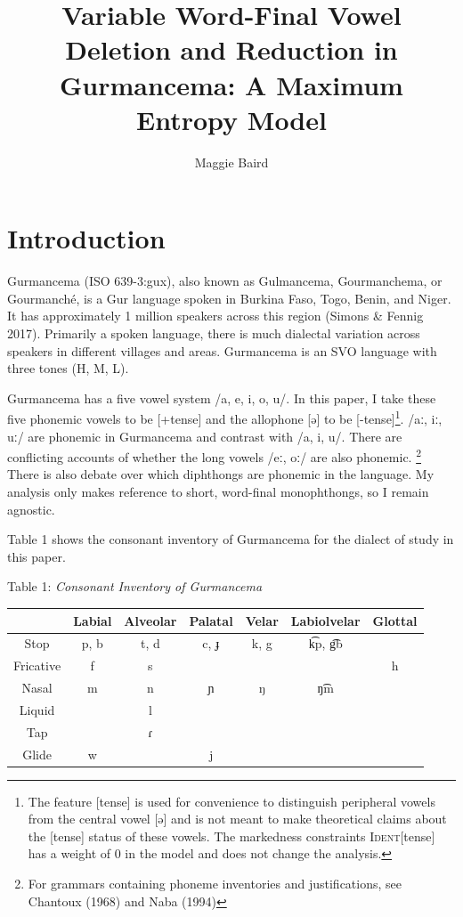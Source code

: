 \documentclass[output=paper,
modfonts
]{langscibook}
\title{Variable Word-Final Vowel Deletion and Reduction in Gurmancema: A Maximum Entropy Model}
\author{%
 Maggie Baird\affiliation{Dartmouth College}
}
\begin{document}
\pagestyle{myheadings}

\maketitle
\section{Introduction} 
Gurmancema (ISO 639-3:gux), also known as Gulmancema, Gourmanchema, or Gourmanché, is a Gur language spoken in Burkina Faso, Togo, Benin, and Niger. It has approximately 1 million speakers across this region \cite{ethnologue}(Simons \& Fennig 2017). Primarily a spoken language, there is much dialectal variation across speakers in different villages and areas. Gurmancema is an SVO language with three tones (H, M, L). 

Gurmancema has a five vowel system /a, e, i, o, u/. In this paper, I take these five phonemic vowels to be [+tense] and the allophone [ə] to be [-tense]\footnote{The feature [tense] is used for convenience to distinguish peripheral vowels from the central vowel [ə] and is not meant to make theoretical claims about the [tense] status of these vowels. The markedness constraints \textsc{Ident}[tense] has a weight of 0 in the model and does not change the analysis.}.  /aː, iː, uː/ are phonemic in Gurmancema and contrast with /a, i, u/. There are conflicting accounts of whether the long vowels /eː, oː/ are also phonemic. \footnote{For grammars containing phoneme inventories and justifications, see Chantoux (1968) and Naba 
(1994)}
There is also debate over which diphthongs are phonemic in the language. My 
analysis only makes reference to short, word-final monophthongs, so I remain 
agnostic.

Table 1 shows the consonant inventory of Gurmancema for the dialect of study in this paper. 

\begin{center} Table 1: \textit{Consonant Inventory of Gurmancema} \\
\vspace{5mm}
\renewcommand{\arraystretch}{1.5}
\begin{tabular}{ |c | c| c | c | c | c | c |}
\hline
  & Labial & Alveolar & Palatal & Velar & Labiolvelar & Glottal\\ 
 \hline
 Stop & p, b & t, d & c, ɟ & k, g & k͡p, g͡b & \\
 \hline
 Fricative & f & s &  &  &  & h\\
 \hline
 Nasal & m & n & ɲ & ŋ & ŋ͡m & \\
 \hline
 Liquid &  & l &  &  & & \\
 \hline
 Tap &  & ɾ  &  &  &  & \\
 \hline
 Glide & w & & j & &  & \\
 \hline
\end{tabular}
\end{center}
\end{document}
